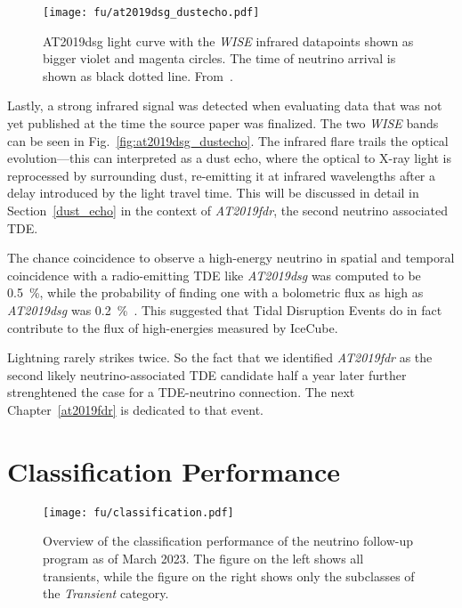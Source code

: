 \begin{figure}[htb]
    \texttt{[image: fu/at2019dsg\_dustecho.pdf]}
    \caption[AT2019dsg infrared light curve]{AT2019dsg light curve with the \textit{WISE} infrared datapoints shown as bigger violet and magenta circles. The time of neutrino arrival is shown as black dotted line. From~\cite{Reusch2023b}.}
\end{figure}

\pagebreak

Lastly, a strong infrared signal was detected when evaluating   data that was not yet published at the time the source paper was finalized. The two \textit{WISE} bands can be seen in Fig.~\ref{fig:at2019dsg_dustecho}. The infrared flare trails the optical evolution---this can interpreted as a dust echo, where the optical to X-ray light is reprocessed by surrounding dust, re-emitting it at infrared wavelengths after a delay introduced by the light travel time. This will be discussed in detail in Section~\ref{dust_echo} in the context of \emph{AT2019fdr}, the second neutrino associated TDE.

The chance coincidence to observe a high-energy neutrino in spatial and temporal coincidence with a radio-emitting TDE like \emph{AT2019dsg} was computed to be \SI{0.5}{\percent}, while the probability of finding one with a bolometric flux as high as \emph{AT2019dsg} was \SI{0.2}{\percent}~\cite{Stein2021}. This suggested that Tidal Disruption Events do in fact contribute to the flux of high-energies measured by IceCube.

Lightning rarely strikes twice. So the fact that we identified \emph{AT2019fdr} as the second likely neutrino-associated TDE candidate half a year later further strenghtened the case for a TDE-neutrino connection. The next Chapter~\ref{at2019fdr} is dedicated to that event.

\section{Classification Performance}\label{classification_performance}

\begin{figure*}[htb]
    \texttt{[image: fu/classification.pdf]}
    \caption[Follow-up classification overview]{Overview of the classification performance of the neutrino follow-up program as of March 2023. The figure on the left shows all transients, while the figure on the right shows only the subclasses of the \textit{Transient} category.}
\end{figure*}

